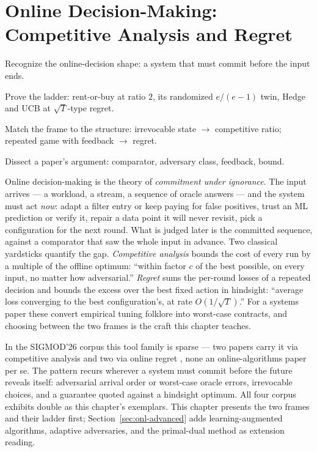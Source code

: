 \chapter{Online Decision-Making: Competitive Analysis and Regret}
\setcounter{section}{-1}   %
\label{ch:onl}

\begin{objectives}
\item Recognize the online-decision shape: a system that must commit before the input ends.
\item Prove the ladder: rent-or-buy at ratio $2$, its randomized $e/(e-1)$ twin, Hedge and
  UCB at $\sqrt{T}$-type regret.
\item Match the frame to the structure: irrevocable state $\to$ competitive ratio; repeated
  game with feedback $\to$ regret.
\item Dissect a paper's argument: comparator, adversary class, feedback, bound.
\end{objectives}

Online decision-making is the theory of \emph{commitment under ignorance}. The input
arrives --- a workload, a stream, a sequence of oracle answers --- and the system must act
\emph{now}: adapt a filter entry or keep paying for false positives, trust an ML
prediction or verify it, repair a data point it will never revisit, pick a configuration
for the next round. What is judged later is the committed sequence, against a comparator
that saw the whole input in advance. Two classical yardsticks quantify the gap.
\emph{Competitive analysis} bounds the cost of every run by a multiple of the offline
optimum: ``within factor $c$ of the best possible, on every input, no matter how
adversarial.'' \emph{Regret} sums the per-round losses of a repeated decision and bounds
the excess over the best fixed action in hindsight: ``average loss converging to the best
configuration's, at rate $O(1/\sqrt{T})$.'' For a systems paper these convert empirical
tuning folklore into worst-case contracts, and choosing between the two frames is the
craft this chapter teaches.

In the SIGMOD'26 corpus this tool family is sparse --- two papers carry it via competitive
analysis \citep{sigmod26-242,sigmod26-094} and two via online regret
\citep{sigmod26-140,sigmod26-221}, none an online-algorithms paper per se. The pattern
recurs wherever a system must commit before the future reveals itself: adversarial
arrival order or worst-case oracle errors, irrevocable choices, and a guarantee quoted
against a hindsight optimum. All four corpus exhibits double as this chapter's
exemplars. This chapter presents the two frames and their ladder first;
Section~\ref{sec:onl-advanced} adds learning-augmented algorithms, adaptive adversaries,
and the primal-dual method as extension reading.

